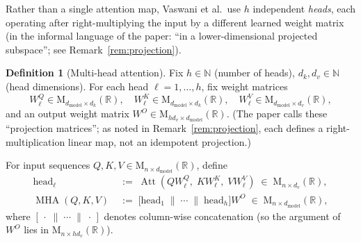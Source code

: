 \documentclass[11pt]{amsart}
\theoremstyle{plain}
\theoremstyle{definition}
\newtheorem{definition}[theorem]{Definition}
\newcommand{\R}{\mathbb{R}}
\newcommand{\N}{\mathbb{N}}
\newcommand{\Mat}[2]{\mathrm{M}_{#1 \times #2}(\R)}
\newcommand{\Att}{\operatorname{Att}}
\newcommand{\MHA}{\operatorname{MHA}}
\begin{document}
Rather than a single attention map, Vaswani et al.\ use $h$ independent
\emph{heads}, each operating after right-multiplying the input by a different
learned weight matrix (in the informal language of the paper: ``in a
lower-dimensional projected subspace''; see Remark~\ref{rem:projection}).

\begin{definition}[Multi-head attention]
\label{def:mha}
Fix $h \in \N$ (number of heads), $d_k, d_v \in \N$ (head dimensions).
For each head $\ell = 1, \ldots, h$, fix weight matrices
\[
    W^Q_\ell \in \Mat{d_{\mathrm{model}}}{d_k}, \quad
    W^K_\ell \in \Mat{d_{\mathrm{model}}}{d_k}, \quad
    W^V_\ell \in \Mat{d_{\mathrm{model}}}{d_v},
\]
and an output weight matrix $W^O \in \Mat{h d_v}{d_{\mathrm{model}}}$.
(The paper calls these ``projection matrices''; as noted in
Remark~\ref{rem:projection}, each defines a right-multiplication linear map,
not an idempotent projection.)

For input sequences $Q, K, V \in \Mat{n}{d_{\mathrm{model}}}$, define
\begin{align*}
    \mathrm{head}_\ell &\;:=\; \Att(Q W^Q_\ell,\; K W^K_\ell,\; V W^V_\ell)
    \;\in\; \Mat{n}{d_v}, \\
    \MHA(Q,K,V) &\;:=\;
    \bigl[ \mathrm{head}_1 \;\|\; \cdots \;\|\; \mathrm{head}_h \bigr] W^O
    \;\in\; \Mat{n}{d_{\mathrm{model}}},
\end{align*}
where $[\,\cdot\;\|\;\cdots\;\|\;\cdot\,]$ denotes column-wise concatenation
(so the argument of $W^O$ lies in $\Mat{n}{h d_v}$).
\end{definition}
\end{document}
